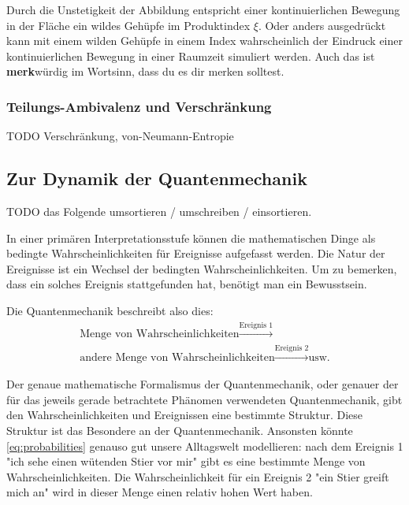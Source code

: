 \documentclass[12pt]{book}
\begin{document}
Durch die Unstetigkeit der Abbildung entspricht einer kontinuierlichen Bewegung in der Fläche ein wildes Gehüpfe im Produktindex $\xi$. Oder anders ausgedrückt kann mit einem wilden Gehüpfe in einem Index wahrscheinlich der Eindruck einer kontinuierlichen Bewegung in einer Raumzeit simuliert werden. Auch das ist \textbf{merk}würdig im Wortsinn, dass du es dir merken solltest.

\subsubsection{Teilungs-Ambivalenz und Verschränkung}

TODO Verschränkung, von-Neumann-Entropie

\subsection{Zur Dynamik der Quantenmechanik}

TODO das Folgende umsortieren / umschreiben / einsortieren.

In einer primären Interpretationsstufe können die mathematischen Dinge als bedingte Wahrscheinlichkeiten für Ereignisse aufgefasst werden. Die Natur der Ereignisse ist ein Wechsel der bedingten Wahrscheinlichkeiten. Um zu bemerken, dass ein solches Ereignis stattgefunden hat, benötigt man ein Bewusstsein.

Die Quantenmechanik beschreibt also dies:
\begin{equation} \label{eq:probabilities}
\begin{split}
\textrm{Menge von Wahrscheinlichkeiten} \xrightarrow{\textrm{Ereignis 1}} \\
\textrm{andere Menge von Wahrscheinlichkeiten} \xrightarrow{\textrm{Ereignis 2}}  \textrm{usw.}
\end{split}
\end{equation}

Der genaue mathematische Formalismus der Quantenmechanik, oder genauer der für das jeweils gerade betrachtete Phänomen verwendeten Quantenmechanik, gibt den Wahrscheinlichkeiten und Ereignissen eine bestimmte Struktur. Diese Struktur ist das Besondere an der Quantenmechanik. Ansonsten könnte \ref{eq:probabilities} genauso gut unsere Alltagswelt modellieren: nach dem Ereignis 1 "ich sehe einen wütenden Stier vor mir" gibt es eine bestimmte Menge von Wahrscheinlichkeiten. Die Wahrscheinlichkeit für ein Ereignis 2 "ein Stier greift mich an" wird in dieser Menge einen relativ hohen Wert haben.
\end{document}
